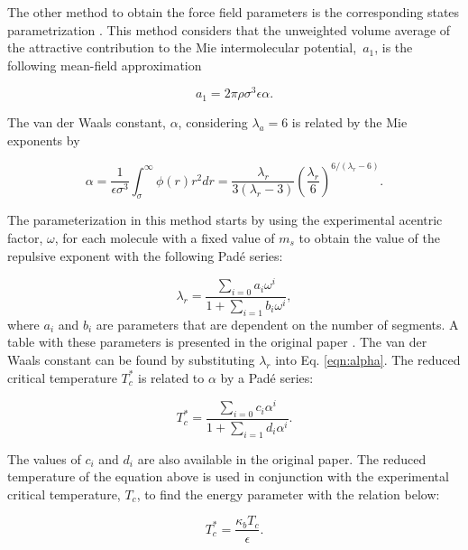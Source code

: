 The other method to obtain the force field parameters is the corresponding states parametrization \cite{mejia2014}. This method considers that the unweighted volume average of the attractive contribution to the Mie intermolecular potential, $ \, a_{1}$, is the following mean-field approximation

\begin{equation}
a_{1} = 2\pi\rho\sigma^{3}\epsilon\alpha .
\label{eqn:a1corres}
\end{equation}

The van der Waals constant, $\alpha$, considering $ \lambda_{a} = 6$ is related by the Mie exponents by

\begin{equation}
\alpha = \frac{1}{\epsilon\sigma^{3    }} \int_{\sigma}^{\infty} \phi(r)r^{2}dr = \frac{\lambda_{r}}{3(\lambda_{r}-3)}\left(\frac{\lambda_r}{6}\right)^{6/(\lambda_{r} - 6)}  .
\label{eqn:alpha}
\end{equation}

The parameterization in this method starts by using the experimental acentric factor, $\omega$, for each molecule with a fixed value of $ m_{s}$ to obtain the value of the repulsive exponent with the following Padé series:

\begin{equation}
\lambda_{r} = \frac{\sum_{i=0} a_{i}\omega^{i}}{1+\sum_{i=1} b_{i}\omega^{i}} ,  
\label{eqn:lambdaco}
\end{equation}
where $a_{i}$ and $b_{i}$ are parameters that are dependent on the number of segments. A table with these parameters is presented in the original paper \cite{mejia2014}. The van der Waals constant can be found by substituting $\lambda_{r}$ into Eq. \eqref{eqn:alpha}. The reduced critical temperature $T_{c}^{*}$ is related to $\alpha$ by a Padé series: 

\begin{equation}
T_{c}^{*} = \frac{\sum_{i=0} c_{i}\alpha^{i}}{1+\sum_{i=1} d_{i}\alpha^{i}}   .
\label{eqn:tc}
\end{equation}

The values of $c_{i}$ and $d_{i}$ are also available in the original paper. The reduced temperature of the equation above is used in conjunction with the experimental critical temperature, $ T_{c}$, to find the energy parameter with the relation below:

\begin{equation}
T_{c}^{*} = \frac{\kappa_{b}T_{c}}{\epsilon}   .
\label{eqn:epscorre}
\end{equation}

